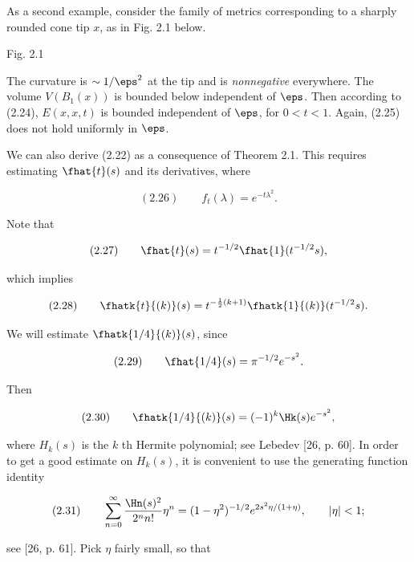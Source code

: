\begin{example}
As a second example, consider the family of metrics corresponding to a
sharply rounded cone tip $x$, as in Fig. 2.1 below.

\begin{center}
Fig. 2.1
\end{center}

The curvature is $\sim 1/\eps^2$ at the tip and is \emph{nonnegative} everywhere. The volume
$V(B_1(x))$ is bounded below independent of $\eps$. Then according to (2.24),
$E(x,x,t)$ is bounded independent of $\eps$, for $0<t<1$. Again, (2.25) does not
hold uniformly in $\eps$.

We can also derive (2.22) as a consequence of Theorem 2.1. This requires
estimating $\fhat{t}(s)$ and its derivatives, where

\begin{equation*}
(2.26)\qquad f_t(\lambda)=e^{-t\lambda^2}.
\end{equation*}

Note that

\begin{equation*}
(2.27)\qquad \fhat{t}(s)=t^{-1/2}\fhat{1}(t^{-1/2}s),
\end{equation*}

which implies

\begin{equation*}
(2.28)\qquad \fhatk{t}{(k)}(s)=t^{-\frac12(k+1)}\fhatk{1}{(k)}(t^{-1/2}s).
\end{equation*}

We will estimate $\fhatk{1/4}{(k)}(s)$, since

\begin{equation*}
(2.29)\qquad \fhat{1/4}(s)=\pi^{-1/2}e^{-s^2}.
\end{equation*}

Then

\begin{equation*}
(2.30)\qquad \fhatk{1/4}{(k)}(s)=(-1)^k\Hk(s)e^{-s^2},
\end{equation*}

where $H_k(s)$ is the $k$ th Hermite polynomial; see Lebedev [26, p. 60]. In order
to get a good estimate on $H_k(s)$, it is convenient to use the generating function
identity

\begin{equation*}
(2.31)\qquad \sum_{n=0}^{\infty}\frac{\Hn(s)^2}{2^n n!}\eta^n=(1-\eta^2)^{-1/2}e^{2s^2\eta/(1+\eta)}, \qquad |\eta|<1;
\end{equation*}

see [26, p. 61]. Pick $\eta$ fairly small, so that


\end{example}
